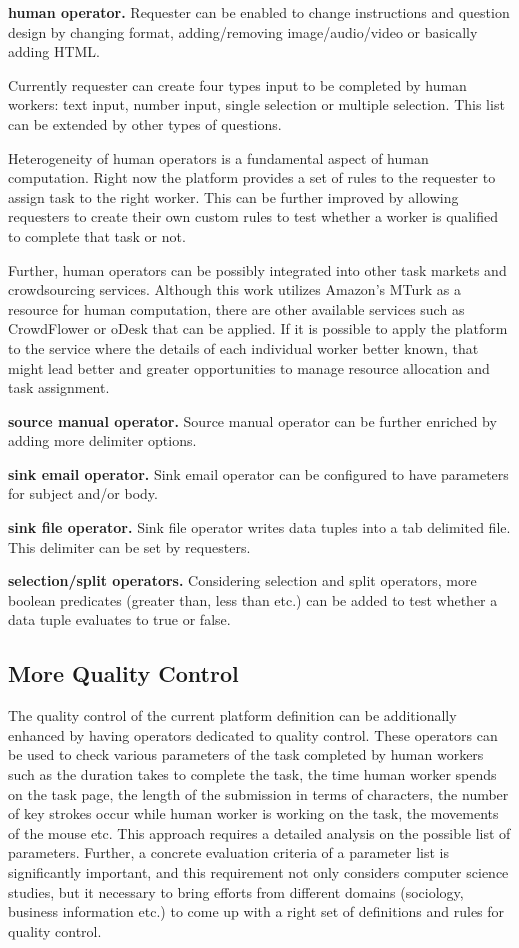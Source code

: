 \textbf{human operator.}
Requester can be enabled to change instructions and question design by changing format, adding/removing image/audio/video or basically adding HTML.

Currently requester can create four types input to be completed by human workers: text input, number input, single selection or multiple selection. This list can be extended by other types of questions.

Heterogeneity of human operators is a fundamental aspect of human computation. Right now the platform provides a set of rules to the requester to assign task to the right worker. This can be further improved by allowing requesters to create their own custom rules to test whether a worker is qualified to complete that task or not.

Further, human operators can be possibly integrated into other task markets and crowdsourcing services. Although this work utilizes Amazon's MTurk as a resource for human computation, there are other available services such as CrowdFlower or oDesk that can be applied. If it is possible to apply the platform to the service where the details of each individual worker better known, that might lead better and greater opportunities to manage resource allocation and task assignment.

\textbf{source manual operator.}
Source manual operator can be further enriched by adding more delimiter options.

\textbf{sink email operator.}
Sink email operator can be configured to have parameters for subject and/or body.

\textbf{sink file operator.}
Sink file operator writes data tuples into a tab delimited file. This delimiter can be set by requesters.

\textbf{selection/split operators.}
Considering selection and split operators, more boolean predicates (greater than, less than etc.) can be added to test whether a data tuple evaluates to true or false.

\subsection{More Quality Control}
The quality control of the current platform definition can be additionally enhanced by having operators dedicated to quality control. These operators can be used to check various parameters of the task completed by human workers such as the duration takes to complete the task, the time human worker spends on the task page, the length of the submission in terms of characters, the number of key strokes occur while human worker is working on the task, the movements of the mouse etc. This approach requires a detailed analysis on the possible list of parameters. Further, a concrete evaluation criteria of a parameter list is significantly important, and this requirement not only considers computer science studies, but it necessary to bring efforts from different domains (sociology, business information etc.) to come up with a right set of definitions and rules for quality control.
